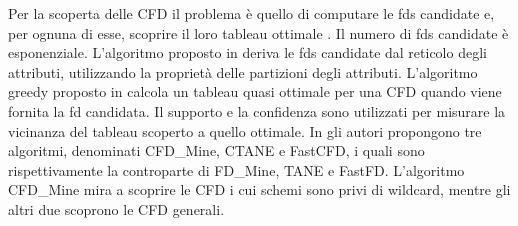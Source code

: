 Per la scoperta delle CFD il problema \`{e} quello di computare le \acrshort{fds} candidate e, per ognuna di esse, scoprire il loro tableau ottimale \cite{generatingtableaux}. Il numero di \acrshort{fds} candidate \`{e} esponenziale. L'algoritmo proposto in \cite{discoveringdataqualityrules} deriva le \acrshort{fds} candidate dal reticolo degli attributi, utilizzando la propriet\`{a} delle partizioni degli attributi. L'algoritmo greedy proposto in \cite{generatingtableaux} calcola un tableau quasi ottimale per una CFD quando viene fornita la \acrshort{fd} candidata. Il supporto e la confidenza sono utilizzati per misurare la vicinanza del tableau scoperto a quello ottimale. In \cite{discoveringconditionalfd} gli autori propongono tre algoritmi, denominati CFD\_Mine, CTANE e FastCFD, i quali sono rispettivamente la controparte di FD\_Mine\cite{fdmine}, TANE\cite{tanealgfd} e FastFD\cite{fastfds}. L'algoritmo CFD\_Mine mira a scoprire le CFD i cui schemi sono privi di wildcard, mentre gli altri due scoprono le CFD generali.\par
